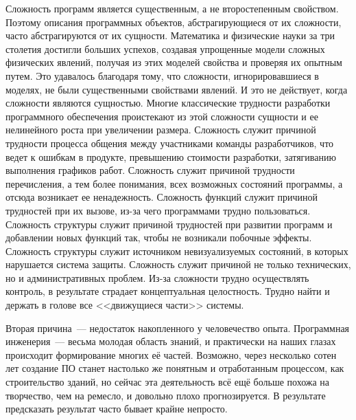 \documentclass{../../text-style}
\begin{document}
Сложность программ является существенным, а не второстепенным свойством. Поэтому описания программных объектов, абстрагирующиеся от их сложности, часто абстрагируются от их сущности. Математика и физические науки за три столетия достигли больших успехов, создавая упрощенные модели сложных физических явлений, получая из этих моделей свойства и проверяя их опытным путем. Это удавалось благодаря тому, что сложности, игнорировавшиеся в моделях, не были существенными свойствами явлений. И это не действует, когда сложности являются сущностью. Многие классические трудности разработки программного обеспечения проистекают из этой сложности сущности и ее нелинейного роста при увеличении размера. Сложность служит причиной трудности процесса общения между участниками команды разработчиков, что ведет к ошибкам в продукте, превышению стоимости разработки, затягиванию выполнения графиков работ. Сложность служит причиной трудности перечисления, а тем более понимания, всех возможных состояний программы, а отсюда возникает ее ненадежность. Сложность функций служит причиной трудностей при их вызове, из-за чего программами трудно пользоваться. Сложность структуры служит причиной трудностей при развитии программ и добавлении новых функций так, чтобы не возникали побочные эффекты. Сложность структуры служит источником невизуализуемых состояний, в которых нарушается система защиты. Сложность служит причиной не только технических, но и административных проблем. Из-за сложности трудно осуществлять контроль, в результате страдает концептуальная целостность. Трудно найти и держать в голове все <<движущиеся части>> системы. 

Вторая причина~--- недостаток накопленного у человечество опыта. Программная инженерия~--- весьма молодая область знаний, и практически на наших глазах происходит формирование многих её частей. Возможно, через несколько сотен лет создание ПО станет настолько же понятным и отработанным процессом, как строительство зданий, но сейчас эта деятельность всё ещё больше похожа на творчество, чем на ремесло, и довольно плохо прогнозируется. В результате предсказать результат часто бывает крайне непросто.
\end{document}
